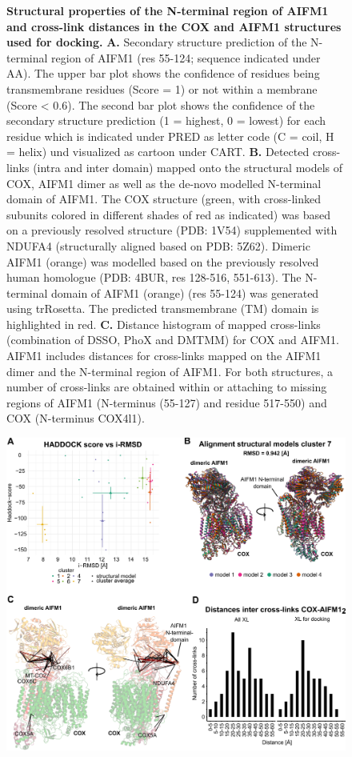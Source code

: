\begin{subappendices}
\begin{figure}[htb]
        \caption{\textbf{Structural properties of the N-terminal region of AIFM1 and cross-link distances in the COX and AIFM1 structures used for docking.} \textbf{A.} Secondary structure prediction of the N-terminal region of AIFM1 (res 55-124; sequence indicated under AA). The upper bar plot shows the confidence of residues being transmembrane residues (Score = 1) or not within a membrane (Score < 0.6). The second bar plot shows the confidence of the secondary structure prediction (1 = highest, 0 = lowest) for each residue which is indicated under PRED as letter code (C = coil, H = helix) und visualized as cartoon under CART. \textbf{B.} Detected cross-links (intra and inter domain) mapped onto the structural models of COX, AIFM1 dimer as well as the de-novo modelled N-terminal domain of AIFM1. The COX structure (green, with cross-linked subunits colored in different shades of red as indicated) was based on a previously resolved structure (PDB: 1V54) supplemented with NDUFA4 (structurally aligned based on PDB: 5Z62). Dimeric AIFM1 (orange) was modelled based on the previously resolved human homologue (PDB: 4BUR, res 128-516, 551-613). The N-terminal domain of AIFM1 (orange) (res 55-124) was generated using trRosetta. The predicted transmembrane (TM) domain is highlighted in red. \textbf{C.} Distance histogram of mapped cross-links (combination of DSSO, PhoX and DMTMM) for COX and AIFM1. AIFM1 includes distances for cross-links mapped on the AIFM1 dimer and the N-terminal region of AIFM1. For both structures, a number of cross-links are obtained within or attaching to missing regions of AIFM1 (N-terminus (55-127) and residue 517-550) and COX (N-terminus COX4l1).}
        \label{fig:ch3_app_fig3}
    \end{figure}
    \begin{figure}[htb]
        \center
        \includegraphics[]{Chapter.3/Figures/SI_Figure4.png}

\end{figure}
\end{subappendices}
